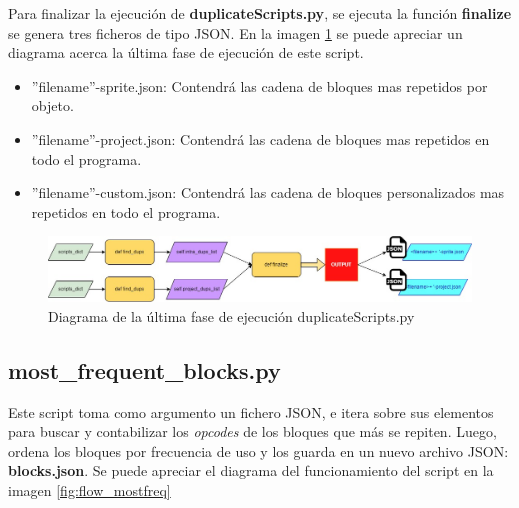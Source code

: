 \documentclass[a4paper, 12pt]{book}
\begin{document}
Para finalizar la ejecución de \textbf{duplicateScripts.py}, se ejecuta la función \textbf{finalize} se genera tres ficheros de tipo JSON. En la imagen \ref{fig:flow_finddups} se puede apreciar un diagrama acerca la última fase de ejecución de este script.

\begin{itemize}
\item ''filename''-sprite.json: Contendrá las cadena de bloques mas repetidos por objeto.
\item ''filename''-project.json: Contendrá las cadena de bloques mas repetidos en todo el programa.
\item ''filename''-custom.json: Contendrá las cadena de bloques personalizados mas repetidos en todo el programa.
\end{itemize}

\begin{figure}[!htb]
  \centering
  \includegraphics[width=15cm, keepaspectratio]{img/flow_finddups.jpg}
  \caption{Diagrama de la última fase de ejecución duplicateScripts.py}
  \label{fig:flow_finddups}
\end{figure}

\subsection{most\_frequent\_blocks.py}

Este script toma como argumento un fichero JSON, e itera sobre sus elementos para buscar y contabilizar los \textit{opcodes} de los bloques que más se repiten. Luego, ordena los bloques por frecuencia de uso y los guarda en un nuevo archivo JSON: \textbf{blocks.json}. Se puede apreciar el diagrama del funcionamiento del script en la imagen \ref{fig:flow_mostfreq}


\end{document}
